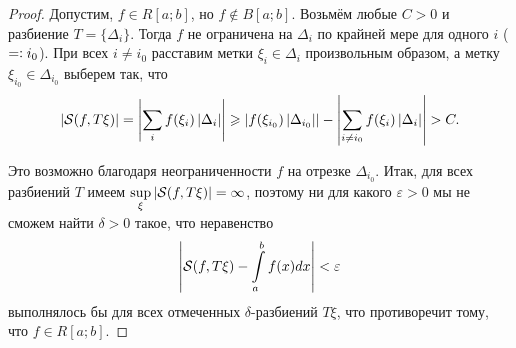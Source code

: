 \begin{proof}
    Допустим, $f \in R[a; b]$, но $f \notin B[a; b]$. Возьмём любые $C > 0$ и разбиение $T = \{\Delta_i\}$. Тогда $f$ не ограничена на $\Delta_i$ по крайней мере для одного $i$ ($=\vcentcolon i_0$). При всех $i \ne i_0$ расставим метки $\xi_i \in \Delta_i$ произвольным образом, а метку $\xi_{i_0} \in \Delta_{i_0}$ выберем так, что
    \[
        \left\lvert\mathcal{S}(f, T\xi)\right\rvert = \left\lvert\sum_if(\xi_i)\left\lvert\Delta_i\right\rvert\right\rvert \geqslant \left\lvert f(\xi_{i_0})\left\lvert\Delta_{i_0}\right\rvert\right\rvert - \left\lvert\sum_{i \ne i_0}f(\xi_i)\left\lvert\Delta_i\right\rvert\right\rvert > C.
    \]

    Это возможно благодаря неограниченности $f$ на отрезке $\Delta_{i_0}$. Итак, для всех разбиений $T$ имеем $\sup\limits_\xi\left\lvert\mathcal{S}(f, T\xi)\right\rvert = \infty$, поэтому ни для какого $\varepsilon > 0$ мы не сможем найти $\delta > 0$ такое, что неравенство \[\displaystyle\left\lvert\mathcal{S}(f, T\xi) - \int\limits_a^bf(x)dx\right\rvert < \varepsilon\] выполнялось бы для всех отмеченных $\delta$-разбиений $T\xi$, что противоречит тому, что $f \in R[a; b]$.
\end{proof}

